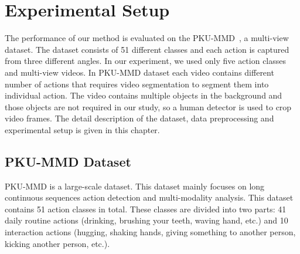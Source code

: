 \chapter{Experimental Setup}
\label{experimentalsetup}
The performance of our method is evaluated on the PKU-MMD~\cite{liu2017pku}, a multi-view dataset. The dataset consists of 51 different classes and each action is captured from three different angles. In our experiment, we used only five action classes and multi-view videos. In PKU-MMD dataset each video contains different number of actions that requires video segmentation to segment them into individual action. The video contains multiple objects in the background and those objects are not required in our study, so a human detector is used to crop video frames. 
The detail description of the dataset, data preprocessing and experimental setup is given in this chapter.

\section{PKU-MMD Dataset}
PKU-MMD is a large-scale dataset. This dataset mainly focuses on long continuous sequences action detection and multi-modality analysis. This dataset contains 51 action classes in total. These classes are divided into two parts: 41 daily routine actions (drinking, brushing your teeth, waving hand, etc.) and 10 interaction actions (hugging, shaking hands, giving something to another person, kicking another person, etc.). 


